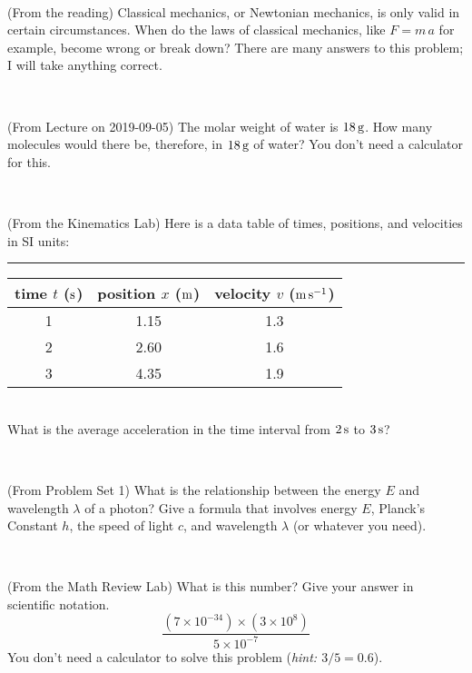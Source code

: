 \documentclass[12pt, letterpaper]{article}
\begin{document}
\vfill ~

\begin{problem} (From the reading)
Classical mechanics, or Newtonian mechanics, is only valid in certain
circumstances. When do the laws of classical mechanics, like $F =
m\,a$ for example, become wrong or break down? There are many answers
to this problem; I will take anything correct.
\end{problem}


\vfill ~

\begin{problem} (From Lecture on 2019-09-05)
The molar weight of water is $18\,\mathrm{g}$. How many molecules would there
be, therefore, in $18\,\mathrm{g}$ of water? You don't need a calculator for
this.
\end{problem}


\vfill ~


\clearpage


\begin{problem} (From the Kinematics Lab)
Here is a data table of times, positions, and velocities in SI units:\\
\rule{1.0in}{0pt}\begin{tabular}{c|c|c}
time $t$ ($\mathrm{s}$) & position $x$ ($\mathrm{m}$) & velocity $v$ ($\mathrm{m}\,\mathrm{s}^{-1}$) \\
\hline
1 & 1.15 & 1.3 \\
2 & 2.60 & 1.6 \\
3 & 4.35 & 1.9 \\
\hline
\end{tabular}\\
What is the average acceleration in the time interval from $2\,\mathrm{s}$ to $3\,\mathrm{s}$?
\end{problem}


\vfill ~

\begin{problem} (From Problem Set 1)
What is the relationship between the energy $E$ and wavelength
$\lambda$ of a photon? Give a formula that involves energy $E$,
Planck's Constant $h$, the speed of light $c$, and wavelength
$\lambda$ (or whatever you need).
\end{problem}

\vfill ~

\begin{problem} (From the Math Review Lab)
What is this number? Give your answer in scientific notation.
$$
\frac{(7\times10^{-34})\times(3\times10^8)}{5\times10^{-7}}
$$
You don't need a calculator to solve this problem (\textit{hint: $3/5=0.6$}).
\end{problem}
\end{document}
